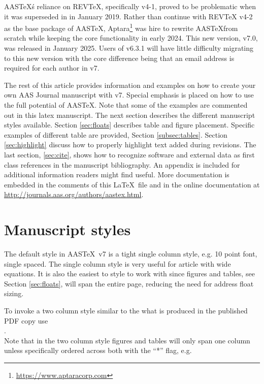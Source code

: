 \documentclass[linenumbers,trackchanges]{aastex7}
\newcommand\aastex{AAS\TeX}
\newcommand\latex{La\TeX}
\begin{document}
\aastex\'s reliance on REVTeX, specifically v4-1, proved to be problematic when it was superseded in in January 2019. Rather than continue with REVTeX v4-2 as the base package of \aastex, Aptara\footnote{\url{https://www.aptaracorp.com}} was hire to rewrite \aastex from scratch while keeping the core functionality in early 2024. This new version, v7.0, was released in January 2025. Users of v6.3.1 will have little difficulty migrating to this new version with the core difference being that an email address is required for each author in v7.

The rest of this article provides information and examples on how to create
your own AAS Journal manuscript with v7.  Special emphasis is placed on
how to use the full potential of \aastex. Note that some of the examples are commented out in this latex manuscript. The next section describes
the different manuscript styles available.
Section \ref{sec:floats} describes table and figure placement. 
Specific examples of different table are provided,  Section
\ref{subsec:tables}.
Section \ref{sec:highlight}
discuss how to properly highlight text added during revisions.  
The last section,
\ref{sec:cite}, shows how to recognize software and external data as first
class references in the manuscript bibliography.  An appendix is included
for additional information readers might find useful.
More documentation is embedded in the comments of this \latex\ file and in the online documentation at
\url{http://journals.aas.org/authors/aastex.html}.

\section{Manuscript styles} \label{sec:style}

The default style in \aastex\ v7 is a tight single column style, e.g. 10
point font, single spaced.  The single column style is very useful for
article with wide equations. It is also the easiest to style to work with
since figures and tables, see Section \ref{sec:floats}, will span the
entire page, reducing the need for address float sizing.

To invoke a two column style similar to the what is produced in
the published PDF copy use \\

. \\

\noindent Note that in the two column style figures and tables will only
span one column unless specifically ordered across both with the ``*'' flag,
e.g. \\
\end{document}
